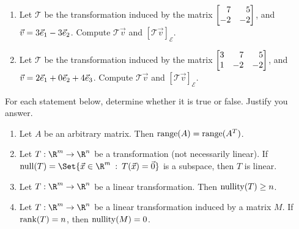 \begin{exercises}
\begin{problist}
		\prob 
		\begin{enumerate}
			\item Let $\mathcal T$ be the transformation induced by the
				matrix $\mat{7&5\\-2&-2}$, and
				$\vec v=3{\vec e_1}-3{\vec e_2}$.
				Compute $\mathcal T\vec v$ and $[\mathcal T\vec v]_{\mathcal E}$.

			\item Let $\mathcal T$ be the transformation induced by the
				matrix $\mat{3&7&5\\1&-2&-2}$, and
				$\vec v=2{\vec e_1}+0{\vec e_2}+4{\vec e_3}$.
				Compute $\mathcal T\vec v$ and $[\mathcal T\vec v]_{\mathcal E}$.
		\end{enumerate}

		\prob For each statement below, determine whether it is true or false. Justify you answer.
		\begin{enumerate}
			\item Let $A$ be an arbitrary matrix. Then $\operatorname{range}(A)=\operatorname{range}(A^{T})$.

			\item Let $T:\R^{m}\to\R^{n}$ be a transformation (not necessarily
				linear). If $\Null(T)=\Set{\vec x\in\R^m \given T(\vec x)=\vec 0}$
				is a subspace, then $T$ is linear.

			\item Let $T:\R^{m}\to\R^{n}$ be a linear transformation.
				Then $\operatorname{nullity}(T) \geq n$.

			\item Let $T:\R^{m}\to\R^{n}$ be a linear transformation
				induced by a matrix $M$. If
				$\operatorname{rank}(T) = n$, then $\operatorname{nullity}(M) = 0$.
		\end{enumerate}
	\end{problist}
\end{exercises}
